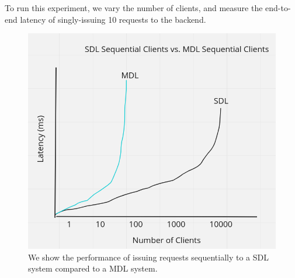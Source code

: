 To run this experiment, we vary the number of clients, and measure the end-to-end latency of singly-issuing 10 requests to the backend.
\begin{figure}[!htb]
\includegraphics[scale=.27]{sequential_MDL.png}
\caption{We show the performance of issuing requests sequentially to a SDL system compared to a MDL system.}
\label{fig:sequential-md}
\end{figure}
